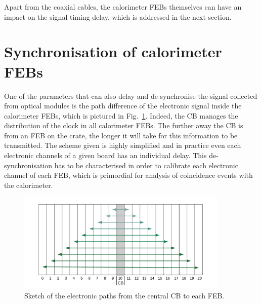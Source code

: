 Apart from the coaxial cables, the calorimeter FEBs themselves can have an impact on the signal timing delay, which is addressed in the next section.

\section{Synchronisation of calorimeter FEBs}
\label{sec:timing_FEB}

One of the parameters that can also delay and de-synchronise the signal collected from optical modules is the path difference of the electronic signal inside the calorimeter FEBs, which is pictured in Fig.~\ref{fig:FEB_scheme}.
Indeed, the CB manages the distribution of the clock in all calorimeter FEBs.
The further away the CB is from an FEB on the crate, the longer it will take for this information to be transmitted.
The scheme given is highly simplified and in practice even each electronic channels of a given board has an individual delay.
This de-synchronisation has to be characterised in order to calibrate each electronic channel of each FEB, which is primordial for analysis of coincidence events with the calorimeter.
\begin{figure}[h!]
  \centering
  \includegraphics[width=0.9\textwidth]{commissioning/fig_commissioning/clock_distribution_back_plain.pdf}
  \caption{Sketch of the electronic paths from the central CB to each FEB.
    \label{fig:FEB_scheme}}
\end{figure}

